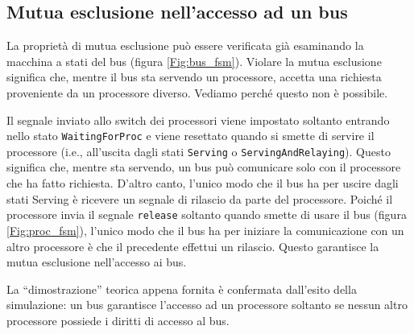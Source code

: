 \subsection{Mutua esclusione nell'accesso ad un bus}
La proprietà di mutua esclusione può essere verificata già esaminando la macchina a stati del bus (figura \ref{Fig:bus_fsm}). Violare la mutua esclusione significa che, mentre il bus sta servendo un processore, accetta una richiesta proveniente da un processore diverso. Vediamo perché questo non è possibile.

Il segnale inviato allo switch dei processori viene impostato soltanto entrando nello stato \texttt{WaitingForProc} e viene resettato quando si smette di servire il processore (i.e., all'uscita dagli stati \texttt{Serving} o \texttt{ServingAndRelaying}). Questo significa che, mentre sta servendo, un bus può comunicare solo con il processore che ha fatto richiesta. D'altro canto, l'unico modo che il bus ha per uscire dagli stati Serving è ricevere un segnale di rilascio da parte del processore. Poiché il processore invia il segnale \texttt{release} soltanto quando smette di usare il bus (figura \ref{Fig:proc_fsm}), l'unico modo che il bus ha per iniziare la comunicazione con un altro processore è che il precedente effettui un rilascio. Questo garantisce la mutua esclusione nell'accesso ai bus.

La \textquotedblleft dimostrazione\textquotedblright{} teorica appena fornita è confermata dall'esito della simulazione: un bus garantisce l'accesso ad un processore soltanto se nessun altro processore possiede i diritti di accesso al bus.








